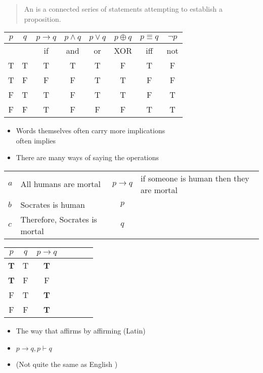 \documentclass[headrule,footrule]{foils}
\begin{document}
\begin{quote}
  An  is a connected series of statements attempting to
  establish a proposition.
\end{quote}

\begin{center}
  \begin{tabular}{|c|c|c|c|c|c|c|c|}
    \hline
    $p$ & $q$ & $p \rightarrow q$ & $p \wedge q$ & $p \vee q$ 
    & $p \oplus q$ & $p \equiv q$ & $\neg p$\\
    \hline
    &   & if & and & or &  XOR & iff & not  \\
    \hline
    T & T & T & T & T & F & T & F \\ 
    T & F & F & F & T & T & F & F \\  
    F & T & T & F & T & T & F & T\\ 
    F & F & T & F & F & F & T & T\\ \hline
  \end{tabular}
  \begin{itemize}
  \item Words themselves often carry more implications
    \\  often implies 
  \item There are many ways of saying the operations
  \end{itemize}
\end{center}



\begin{center}
  \begin{tabular}{llcl}
    $a$ & All humans are mortal & $p  \rightarrow q$ & 
    \small if someone is human then they are mortal\\
    $b$ & Socrates is human & $p$ \\ \hline
    $c$ & Therefore, Socrates is mortal & $q$
  \end{tabular}


  \begin{tabular}{|c|c|c|c|c|c|c|}
    \hline
    $p$ & $q$ & $p \rightarrow q$  \\
    \hline
    \rowcolor{Gray}
    \textbf{T} & T & \textbf{T}  \\ 
    \textbf{T} & F & F  \\ 
    F & T & \textbf{T}  \\ 
    F & F & \textbf{T}  \\ 
    \hline
  \end{tabular}
\end{center}
\begin{itemize}
\item  The way that affirms by affirming (Latin)
\item $p \rightarrow q, p \vdash q$
\item {}  (Not quite the same as English )
\end{itemize}
\end{document}
